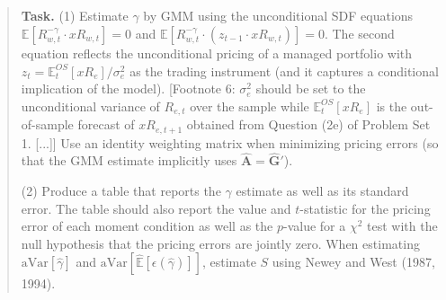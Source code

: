 \documentclass[11pt]{article}
\newcommand{\task}[1]{\begin{quote}\small\textbf{Task.} #1\end{quote}}
\begin{document}
\begin{table}[htbp]
  \centering
  
  \caption{GMM estimate of $\gamma$ from $\widehat{\mathbb{E}}[R_{w,t}^{-\gamma} \cdot xR_{w,t}] = 0$, with
    $R_{w,t} = e^{r_{e,t}}$ and $xR_{w,t} = e^{r_{e,t}} - e^{r_{f,t}}$ from the EQ Dataset, one column per
    sample version. Samples: (1) Common: December 1940 to December 2021 ($T = 973$ months); (2) Max: December
    1927 to December 2021 ($T = 1129$ months). Data: monthly observations of 12-month (annual) real returns.
    Units: decimals. Standard errors in parentheses below the estimates: Newey--West (1987, 1994), Bartlett
    kernel, Newey--West (1994) automatic lag rounded down (selected lag in the table).}
  \label{tab:q3b}
\end{table}

\FloatBarrier
\subsection{}\label{q3c}
\task{(1) Estimate $\gamma$ by GMM using the unconditional SDF equations $\mathbb{E}[R_{w,t}^{-\gamma} \cdot xR_{w,t}] = 0$ and $\mathbb{E}[R_{w,t}^{-\gamma} \cdot (z_{t-1} \cdot xR_{w,t})] = 0$. The second equation reflects the unconditional pricing of a managed portfolio with $z_t = \mathbb{E}^{OS}_t[xR_e]/\sigma^2_e$ as the trading instrument (and it captures a conditional implication of the model). [Footnote 6: $\sigma^2_e$ should be set to the unconditional variance of $R_{e,t}$ over the sample while $\mathbb{E}^{OS}_t[xR_e]$ is the out-of-sample forecast of $xR_{e,t+1}$ obtained from Question (2e) of Problem Set 1. [...]] Use an identity weighting matrix when minimizing pricing errors (so that the GMM estimate implicitly uses $\hat{\mathbf{A}} = \hat{\mathbf{G}}'$).\par (2) Produce a table that reports the $\gamma$ estimate as well as its standard error. The table should also report the value and $t$-statistic for the pricing error of each moment condition as well as the $p$-value for a $\chi^2$ test with the null hypothesis that the pricing errors are jointly zero. When estimating $\mathrm{aVar}[\hat{\gamma}]$ and $\mathrm{aVar}[\widehat{\mathbb{E}}[\epsilon(\hat{\gamma})]]$, estimate $S$ using Newey and West (1987, 1994).}
\end{document}

